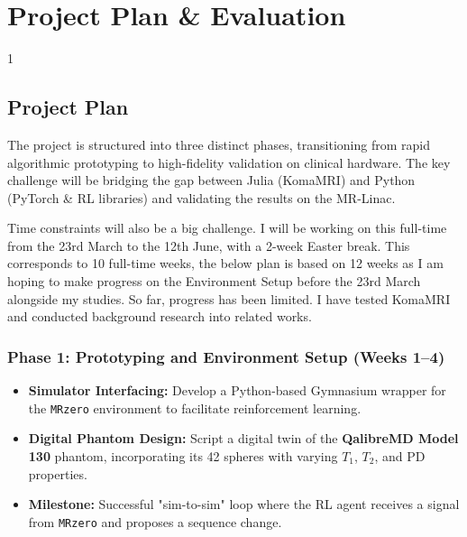 \doublespacing %

\chapter{Project Plan \& Evaluation}
\label{chLast}

\begin{spacing}{1} %
\minitoc %
\end{spacing} %
\thesisspacing %

\section{Project Plan}

The project is structured into three distinct phases, transitioning from rapid algorithmic prototyping to high-fidelity validation on clinical hardware. The key challenge will be bridging the gap between Julia (KomaMRI) and Python (PyTorch \& RL libraries) and validating the results on the MR-Linac.

Time constraints will also be a big challenge. I will be working on this full-time from the 23rd March to the 12th June, with a 2-week Easter break.  This corresponds to 10 full-time weeks, the below plan is based on 12 weeks as I am hoping to make progress on the Environment Setup before the 23rd March alongside my studies. So far, progress has been limited. I have tested KomaMRI and conducted background research into related works.

\subsection{Phase 1: Prototyping and Environment Setup (Weeks 1--4)}
\begin{itemize}
    \item \textbf{Simulator Interfacing:} Develop a Python-based Gymnasium wrapper for the \texttt{MRzero} environment to facilitate reinforcement learning.
    \item \textbf{Digital Phantom Design:} Script a digital twin of the \textbf{QalibreMD Model 130} phantom, incorporating its 42 spheres with varying $T_1$, $T_2$, and PD properties.
    \item \textbf{Milestone:} Successful "sim-to-sim" loop where the RL agent receives a signal from \texttt{MRzero} and proposes a sequence change.
\end{itemize}

